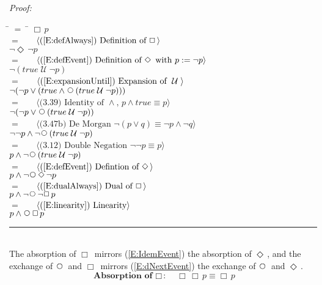 \documentclass[fleqn, leqno]{article}
\newcommand{\lgap}{2pt}                             %
\newcommand{\mymathindent}{24pt}                    %
\newcommand{\Until}{\;\mathcal{U}\;}
\newcommand{\Next}{\;\,\text{\raisebox{3.5pt}{\circle{6}}}}
\newcommand{\Event}{\Diamond\,}
\newcommand{\Always}{\Box\,}
\newcommand{\myqed}{\hfill\rule[-.23ex]{1.2ex}{2.0ex}}
\newcommand{\Gll} {\langle}                         %
\newcommand{\Ggg} {\rangle}                         %
\newcommand{\Hint}[1]     {\ \ \ $\Gll              \mbox{#1} \Ggg$ }   %
\begin{document}
\emph{Proof:}
\begin{tabbing}
\hspace{\mymathindent} \= $= \;$ \= \kill
  \> \>   $\Always p$\\[\lgap]
  \> $=$  \>  \Hint{(\ref{E:defAlways}) Definition of $\Always$}\\[\lgap]
  \> \>   $\neg\Event\neg p$\\[\lgap]
  \> $=$  \>  \Hint{(\ref{E:defEvent}) Definition of $\Event$ with $p := \neg p$}\\[\lgap]
  \> \>   $\neg(true \Until \neg p)$\\[\lgap]
  \> $=$  \>  \Hint{(\ref{E:expansionUntil}) Expansion of $\Until$}\\[\lgap]
  \> \>   $\neg(\neg p \lor (true \land \Next(true \Until \neg p)))$\\[\lgap]
  \> $=$  \>  \Hint{(3.39) Identity of $\land$, $p\land true\equiv p$}\\[\lgap]
  \> \>   $\neg(\neg p \lor \Next(true \Until \neg p))$\\[\lgap]
  \> $=$  \>  \Hint{(3.47b) De Morgan $\neg (p \lor q) \equiv \neg p \land \neg q$}\\[\lgap]
  \> \>   $\neg\neg p \land \neg\Next(true \Until \neg p)$\\[\lgap]
  \> $=$  \>  \Hint{(3.12) Double Negation $\neg\neg p\equiv p$}\\[\lgap]
  \> \>   $p \land \neg\Next(true \Until \neg p)$\\[\lgap]
  \> $=$  \>  \Hint{(\ref{E:defEvent}) Defintion of $\Event$}\\[\lgap]
  \> \>   $p \land \neg\Next\Event\neg p$\\[\lgap]
  \> $=$  \>  \Hint{(\ref{E:dualAlways}) Dual of $\Always$}\\[\lgap]
  \> \>   $p \land \neg\Next\neg\Always p$\\[\lgap]
  \> $=$  \>  \Hint{(\ref{E:linearity}) Linearity}\\[\lgap]
  \> \>   $p \land \Next\Always p$
\end{tabbing}
\myqed\\[\lgap]

The absorption of $\Always$ mirrors (\ref{E:IdemEvent}) the absorption of $\Event$,
and the exchange of $\Next$ and $\Always$ mirrors (\ref{E:dNextEvent}) the exchange of $\Next$ and $\Event$.
\begin{equation}\label{E:IdemAlways}
\textbf{Absorption of $\Always$:}\quad \Always\Always p \equiv \Always p
\end{equation}
\end{document}
